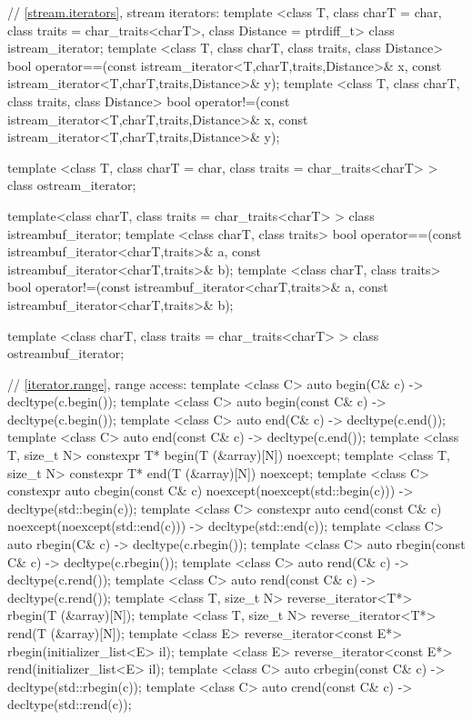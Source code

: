 \begin{codeblock}

  // \ref{stream.iterators}, stream iterators:
  template <class T, class charT = char, class traits = char_traits<charT>,
      class Distance = ptrdiff_t>
  class istream_iterator;
  template <class T, class charT, class traits, class Distance>
    bool operator==(const istream_iterator<T,charT,traits,Distance>& x,
            const istream_iterator<T,charT,traits,Distance>& y);
  template <class T, class charT, class traits, class Distance>
    bool operator!=(const istream_iterator<T,charT,traits,Distance>& x,
            const istream_iterator<T,charT,traits,Distance>& y);

  template <class T, class charT = char, class traits = char_traits<charT> >
      class ostream_iterator;

  template<class charT, class traits = char_traits<charT> >
    class istreambuf_iterator;
  template <class charT, class traits>
    bool operator==(const istreambuf_iterator<charT,traits>& a,
            const istreambuf_iterator<charT,traits>& b);
  template <class charT, class traits>
    bool operator!=(const istreambuf_iterator<charT,traits>& a,
            const istreambuf_iterator<charT,traits>& b);

  template <class charT, class traits = char_traits<charT> >
    class ostreambuf_iterator;

  // \ref{iterator.range}, range access:
  template <class C> auto begin(C& c) -> decltype(c.begin());
  template <class C> auto begin(const C& c) -> decltype(c.begin());
  template <class C> auto end(C& c) -> decltype(c.end());
  template <class C> auto end(const C& c) -> decltype(c.end());
  template <class T, size_t N> constexpr T* begin(T (&array)[N]) noexcept;
  template <class T, size_t N> constexpr T* end(T (&array)[N]) noexcept;
  template <class C> constexpr auto cbegin(const C& c) noexcept(noexcept(std::begin(c)))
    -> decltype(std::begin(c));
  template <class C> constexpr auto cend(const C& c) noexcept(noexcept(std::end(c)))
    -> decltype(std::end(c));
  template <class C> auto rbegin(C& c) -> decltype(c.rbegin());
  template <class C> auto rbegin(const C& c) -> decltype(c.rbegin());
  template <class C> auto rend(C& c) -> decltype(c.rend());
  template <class C> auto rend(const C& c) -> decltype(c.rend());
  template <class T, size_t N> reverse_iterator<T*> rbegin(T (&array)[N]);
  template <class T, size_t N> reverse_iterator<T*> rend(T (&array)[N]);
  template <class E> reverse_iterator<const E*> rbegin(initializer_list<E> il);
  template <class E> reverse_iterator<const E*> rend(initializer_list<E> il);
  template <class C> auto crbegin(const C& c) -> decltype(std::rbegin(c));
  template <class C> auto crend(const C& c) -> decltype(std::rend(c));
\end{codeblock}
